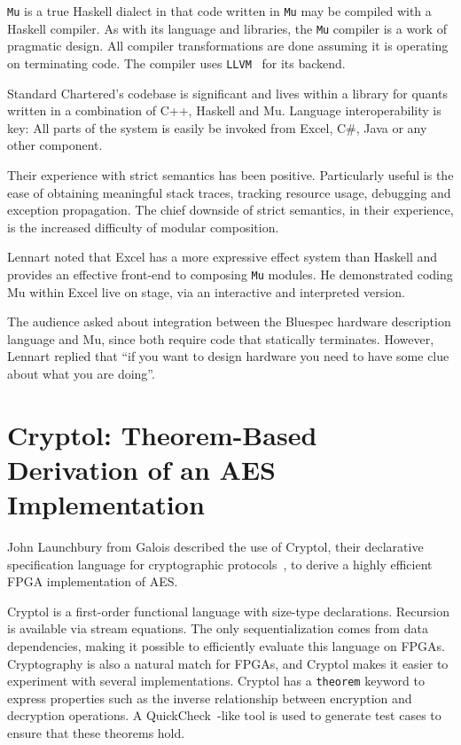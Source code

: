 \documentclass{jfp1}
\begin{document}
{\tt Mu} is a true Haskell dialect in that code written in {\tt Mu}
may be compiled with a Haskell compiler.  As with its language and
libraries, the {\tt Mu} compiler is a work of pragmatic design.  All
compiler transformations are done assuming it is operating on
terminating code.  The compiler uses {\tt LLVM}~\cite{llvm} for its
backend.

Standard Chartered's codebase is significant and lives within a library
for quants written in a combination of C++, Haskell and Mu.  Language
interoperability is key: All parts of the system is easily be invoked
from Excel, C\#, Java or any other component.

Their experience with strict semantics has been positive.  Particularly
useful is the ease of obtaining meaningful stack traces, tracking
resource usage, debugging and exception propagation.  The chief downside
of strict semantics, in their experience, is the increased difficulty of
modular composition.

Lennart noted that Excel has a more expressive effect system than
Haskell and provides an effective front-end to composing {\tt Mu}
modules.  He demonstrated coding Mu within Excel live on stage, via an
interactive and interpreted version.

The audience asked about integration between the Bluespec hardware description
language and Mu, since both require code that statically terminates. However,
Lennart replied that ``if you want to design hardware you need to have some
clue about what you are doing''.

\section{Cryptol: Theorem-Based Derivation of an AES Implementation}

John Launchbury from Galois described the use of Cryptol, their
declarative specification language for cryptographic
protocols~\cite{xxx}, to derive a highly efficient FPGA implementation
of AES.

Cryptol is a first-order functional language with size-type
declarations.  Recursion is available via stream equations.  The only
sequentialization comes from data dependencies, making it possible to
efficiently evaluate this language on FPGAs. Cryptography is also a
natural match for FPGAs, and Cryptol makes it easier to experiment with
several implementations. Cryptol has a {\tt theorem} keyword to express
properties such as the inverse relationship between encryption and
decryption operations. A QuickCheck~\cite{x}-like tool is used to
generate test cases to ensure that these theorems hold.
\end{document}
